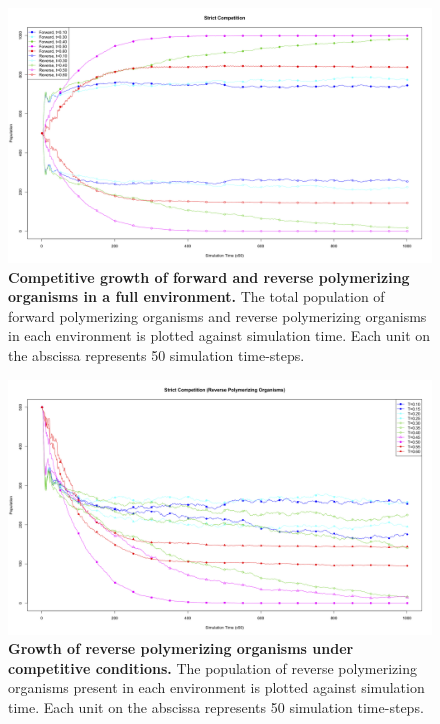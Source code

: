 \begin{figure}[h]
	\centering
		\includegraphics[width=\textwidth]{strict_num}
	\caption{\textbf{Competitive growth of forward and reverse polymerizing organisms in a full environment.} The total population of forward polymerizing organisms and reverse polymerizing organisms in each environment is plotted against simulation time. Each unit on the abscissa represents 50 simulation time-steps.}
	\label{fig:strict_num}
\end{figure}

\begin{figure}[h]
	\centering
		\includegraphics[width=\textwidth]{strict_num_rev}
	\caption{\textbf{Growth of reverse polymerizing organisms under competitive conditions.} The population of reverse polymerizing organisms present in each environment is plotted against simulation time. Each unit on the abscissa represents 50 simulation time-steps.}
	\label{fig:strict_num_rev}
\end{figure}

